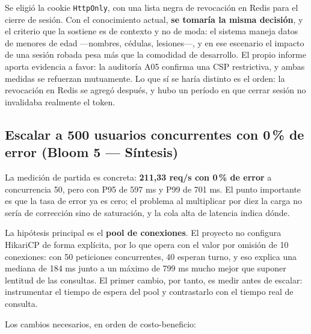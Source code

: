 \documentclass[12pt,a4paper]{article}
\begin{document}
Se eligió la cookie \texttt{HttpOnly}, con una lista negra de revocación en Redis para el cierre
de sesión. Con el conocimiento actual, \textbf{se tomaría la misma decisión}, y el criterio que
la sostiene es de contexto y no de moda: el sistema maneja datos de menores de edad ---nombres,
cédulas, lesiones---, y en ese escenario el impacto de una sesión robada pesa más que la
comodidad de desarrollo. El propio informe aporta evidencia a favor: la auditoría A05 confirma
una CSP restrictiva, y ambas medidas se refuerzan mutuamente. Lo que sí se haría distinto es el
orden: la revocación en Redis se agregó después, y hubo un período en que cerrar sesión no
invalidaba realmente el token.

\subsection{Escalar a 500 usuarios concurrentes con 0\,\% de error (Bloom 5 --- Síntesis)}

La medición de partida es concreta: \textbf{211,33 req/s con 0\,\% de error} a concurrencia 50,
pero con P95 de 597 ms y P99 de 701 ms. El punto importante es que la tasa de error ya es cero;
el problema al multiplicar por diez la carga no sería de corrección sino de saturación, y la cola
alta de latencia indica dónde.

La hipótesis principal es el \textbf{pool de conexiones}. El proyecto no configura HikariCP de
forma explícita, por lo que opera con el valor por omisión de 10 conexiones: con 50 peticiones
concurrentes, 40 esperan turno, y eso explica una mediana de 184 ms junto a un máximo de 799 ms
mucho mejor que suponer lentitud de las consultas. El primer cambio, por tanto, es medir antes
de escalar: instrumentar el tiempo de espera del pool y contrastarlo con el tiempo real de
consulta.

Los cambios necesarios, en orden de costo-beneficio:
\end{document}
